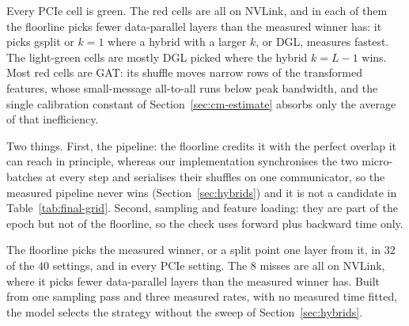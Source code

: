 \begin{table}[h]
\centering
\caption{Floorline pick vs.\ measured winner on the grid of Section~\ref{sec:hybrids}. Each cell is
the pick (D~=~DGL, G~=~gsplit, h$k$~=~hybrid with split point $k$). Dark green~=~exact match;
light green~=~one layer from the measured winner (in parentheses); red~=~two or more layers away. Two single-axis
ablations per model crossing at the default $(L{=}3,\,h{=}1024)$: a hidden sweep at $L{=}3$, then a
depth sweep at $h{=}1024$. Four A100 GPUs, global mini-batch $1024$, forward plus backward time.
GAT shuffle time is scaled by the calibration constant of Section~\ref{sec:cm-estimate}.}
\label{tab:final-grid}

\end{table}

 Every PCIe cell is green. The red cells are all on NVLink,
and in each of them the floorline picks fewer data-parallel layers than the measured winner has:
it picks gsplit or $k{=}1$ where a hybrid with a larger $k$, or DGL, measures fastest. The
light-green cells are mostly DGL picked where the hybrid $k{=}L{-}1$ wins.
Most red cells are GAT: its shuffle moves narrow rows of the transformed features, whose
small-message all-to-all runs below peak bandwidth, and the single calibration constant of
Section~\ref{sec:cm-estimate} absorbs only the average of that inefficiency.

Two things. First, the pipeline: the floorline credits it with the perfect overlap it can reach in
principle, whereas our implementation synchronises the two micro-batches at every step and
serialises their shuffles on one communicator, so the measured pipeline never wins
(Section~\ref{sec:hybrids}) and it is not a candidate in Table~\ref{tab:final-grid}. Second,
sampling and feature loading: they are part of the epoch but not of the floorline, so the check
uses forward plus backward time only.

The floorline picks the measured winner, or a split point one layer from it, in $32$ of the $40$
settings, and in every PCIe setting. The $8$ misses are all on NVLink, where it picks fewer
data-parallel layers than the measured winner has. Built from one sampling pass and three measured
rates, with no measured time fitted, the model selects the strategy without the sweep of
Section~\ref{sec:hybrids}.
